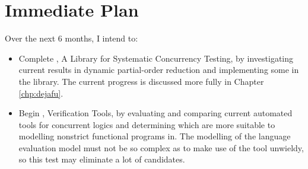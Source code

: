 \section{Immediate Plan}
\label{sec:proposal-plan}

Over the next 6 months, I intend to:

\begin{itemize}
  \item Complete , A Library for Systematic Concurrency
    Testing, by investigating current results in dynamic partial-order
    reduction and implementing some in the library. The current
    progress is discussed more fully in Chapter \ref{chp:dejafu}.

  \item Begin , Verification Tools, by evaluating and
    comparing current automated tools for concurrent logics and
    determining which are more suitable to modelling nonstrict
    functional programs in. The modelling of the language evaluation
    model must not be so complex as to make use of the tool unwieldy,
    so this test may eliminate a lot of candidates.
\end{itemize}


